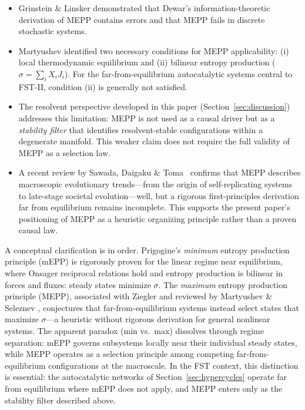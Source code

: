 \documentclass[12pt,a4paper]{article}
\theoremstyle{remark}
\begin{document}
\begin{itemize}
\item Grinstein \& Linsker \citep{GrinsteinLinsker2007} demonstrated that Dewar's information-theoretic derivation of MEPP contains errors and that MEPP fails in discrete stochastic systems.
\item Martyushev \citep{Martyushev2010} identified two necessary conditions for MEPP applicability: (i) local thermodynamic equilibrium and (ii) bilinear entropy production ($\sigma = \sum_i X_i J_i$). For the far-from-equilibrium autocatalytic systems central to FST-II, condition (ii) is generally not satisfied.
\item The resolvent perspective developed in this paper (Section~\ref{sec:discussion}) addresses this limitation: MEPP is not used as a causal driver but as a \emph{stability filter} that identifies resolvent-stable configurations within a degenerate manifold. This weaker claim does not require the full validity of MEPP as a selection law.
\item A recent review by Sawada, Daigaku \& Toma~\citep{Toma2025} confirms that MEPP describes macroscopic evolutionary trends---from the origin of self-replicating systems to late-stage societal evolution---well, but a rigorous first-principles derivation far from equilibrium remains incomplete. This supports the present paper's positioning of MEPP as a heuristic organizing principle rather than a proven causal law.
\end{itemize}

\noindent
A conceptual clarification is in order. Prigogine's \emph{minimum} entropy production principle (mEPP) \citep{Prigogine1947} is rigorously proven for the linear regime near equilibrium, where Onsager reciprocal relations hold and entropy production is bilinear in forces and fluxes: steady states minimize $\sigma$. The \emph{maximum} entropy production principle (MEPP), associated with Ziegler \citep{Ziegler1963} and reviewed by Martyushev \& Seleznev \citep{MEPP2006}, conjectures that far-from-equilibrium systems instead select states that maximize $\sigma$---a heuristic without rigorous derivation for general nonlinear systems. The apparent paradox (min vs.\ max) dissolves through regime separation: mEPP governs subsystems locally near their individual steady states, while MEPP operates as a selection principle among competing far-from-equilibrium configurations at the macroscale. In the FST context, this distinction is essential: the autocatalytic networks of Section~\ref{sec:hypercycles} operate far from equilibrium where mEPP does not apply, and MEPP enters only as the stability filter described above.
\end{document}
